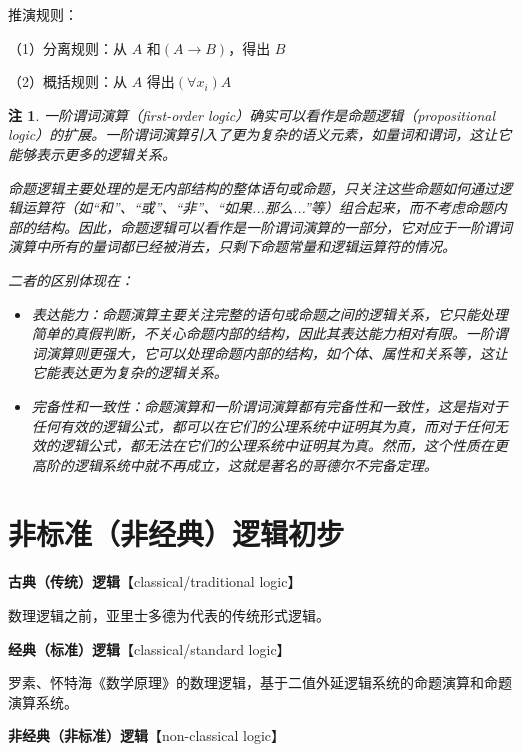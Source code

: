 \documentclass[12pt,onecolumn,a4paper]{book}
\newtheorem*{note}{注}
\numberwithin{table}{subsection}
\numberwithin{equation}{subsection}
\begin{document}
推演规则：

（1）分离规则：从 $A$ 和$(A→B )$，得出 $B$

（2）概括规则：从 $A$ 得出$(\forall x_i)A$

\begin{note}
    
一阶谓词演算（first-order logic）确实可以看作是命题逻辑（propositional logic）的扩展。一阶谓词演算引入了更为复杂的语义元素，如量词和谓词，这让它能够表示更多的逻辑关系。

命题逻辑主要处理的是无内部结构的整体语句或命题，只关注这些命题如何通过逻辑运算符（如“和”、“或”、“非”、“如果...那么...”等）组合起来，而不考虑命题内部的结构。因此，命题逻辑可以看作是一阶谓词演算的一部分，它对应于一阶谓词演算中所有的量词都已经被消去，只剩下命题常量和逻辑运算符的情况。

二者的区别体现在：

\begin{itemize}[itemsep=0pt,parsep=0pt]
    \item 表达能力：命题演算主要关注完整的语句或命题之间的逻辑关系，它只能处理简单的真假判断，不关心命题内部的结构，因此其表达能力相对有限。一阶谓词演算则更强大，它可以处理命题内部的结构，如个体、属性和关系等，这让它能表达更为复杂的逻辑关系。

    \item 完备性和一致性：命题演算和一阶谓词演算都有完备性和一致性，这是指对于任何有效的逻辑公式，都可以在它们的公理系统中证明其为真，而对于任何无效的逻辑公式，都无法在它们的公理系统中证明其为真。然而，这个性质在更高阶的逻辑系统中就不再成立，这就是著名的哥德尔不完备定理。
\end{itemize}
\end{note}


\chapter{非标准（非经典）逻辑初步}\label{chap9}

\textbf{古典（传统）逻辑}【classical/traditional logic】

数理逻辑之前，亚里士多德为代表的传统形式逻辑。

\textbf{经典（标准）逻辑}【classical/standard logic】

罗素、怀特海《数学原理》的数理逻辑，基于二值外延逻辑系统的命题演算和命题演算系统。

\textbf{非经典（非标准）逻辑}【non-classical logic】
\end{document}
